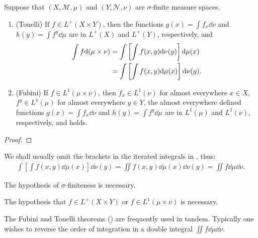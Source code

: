 \begin{theorem}
    Suppose that $(X, \mathcal{M}, \mu)$ and $(Y, \mathcal{N}, \nu)$ are $\sigma$-finite measure spaces.
    \begin{enumerate}
        \item (Tonelli) If $f \in L^+(X \times Y)$, then the functions $g(x) = \int f_x \dd \nu$ and $h(y) = \int f^y \dd \mu$ are in $L^+(X)$ and $L^+(Y)$, respectively, and
        \begin{align}
            \int f \dd (\mu \times \nu) &= \int \left[ \int f(x, y) \dd \nu(y) \right] \dd \mu(x) \labeq{Tonelli} \\
            &= \int \left[ \int f(x, y) \dd \mu(x) \right] \dd \nu(y). \nonumber
        \end{align}
        \item (Fubini) If $f \in L^1(\mu \times \nu)$, then $f_x \in L^1(\nu)$ for almost everywhere $x \in X$, $f^y \in L^1(\mu)$ for almost everywhere $y \in Y$, the almost everywhere defined functions $g(x) = \int f_x \dd \nu$ and $h(y) = \int f^y \dd \mu$ are in $L^1(\mu)$ and $L^1(\nu)$, respectively, and  holds.
    \end{enumerate}
\end{theorem}

\begin{proof}
    
\end{proof}

\begin{remark}
    We shall usually omit the brackets in the iterated integrals in , thus:
    \begin{align}
        \int \left[ \int f(x, y) \dd \mu(x) \right] \dd \nu(y) = \iint f(x, y) \dd \mu(x) \dd \nu(y) = \iint f \dd \mu \dd \nu.
    \end{align}
\end{remark}

\begin{remark}
    The hypothesis of $\sigma$-finiteness is necessary.
\end{remark}

\begin{remark}
    The hypothesis that $f \in L^+(X \times Y)$ or $f \in L^1(\mu \times \nu)$ is necessary, 
\end{remark}

\begin{remark}
    The Fubini and Tonelli theorems () are frequently used in tandem.
    Typically one wishes to reverse the order of integration in a double integral $\iint f \dd \mu \dd \nu$.
\end{remark}

